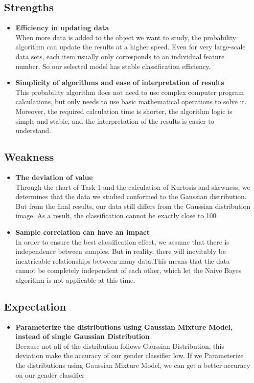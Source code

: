 \documentclass[12pt]{article}
\begin{document}
		\subsection{Strengths}
			\begin{itemize}
				\item
				\textbf{Efficiency in updating data} \\
				When more data is added to the object we want to study, the probability algorithm can update the results at a higher speed. Even for very large-scale data sets, each item usually only corresponds to an individual feature number.  So our selected model has stable classification efficiency.
				\item
				\textbf{Simplicity of algorithms and ease of interpretation of results} \\
				This probability algorithm does not need to use complex computer program calculations, but only needs to use basic mathematical operations to solve it.  Moreover, the required calculation time is shorter, the algorithm logic is simple and stable, and the interpretation of the results is easier to understand.
			\end{itemize}
		
		\subsection{Weakness}
			\begin{itemize}
				\item
				\textbf{The deviation of value} \\
					Through the chart of Task 1 and the calculation of Kurtosis and skewness, we determines that the data we studied conformed to the Gaussian distribution. But from the final results, our data still differs from the Gaussian distribution image. As a result, the classification cannot be exactly close to 100%
				\item
				\textbf{Sample correlation can have an impact} \\
					In order to ensure the best classification effect, we assume that there is independence between samples. But in reality, there will inevitably be inextricable relationships between many data.This means that the data cannot be completely independent of each other, which let  the Naive Bayes algorithm is not applicable at this time.
			\end{itemize}
		
		\subsection{Expectation}
			\begin{itemize}
				\item
				\textbf{Parameterize the distributions using Gaussian Mixture Model, instead of single Gaussian Distribution} \\
				Because not all of the distribution follows Gaussian Distribution, this deviation
				make the accuracy of our gender classifier low. If we Parameterize the distributions
				using Gaussian Mixture Model, we can get a better accuracy on our gender classifier
				
			\end{itemize}
\end{document}
